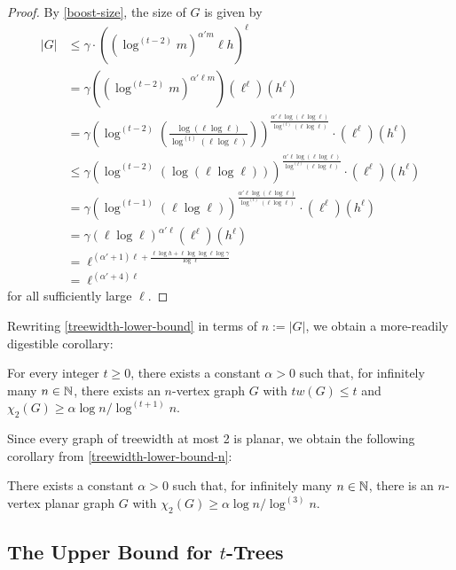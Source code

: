 \documentclass[kpfonts]{patmorin}
\newcommand{\uqs}{\chi_2}
\begin{document}
\begin{proof}
   By \cref{boost-size}, the size of $G$ is given by
   \begin{align*}
        |G| & \le \gamma\cdot \left((\log^{(t-2)}m)^{\alpha' m}\ell h\right)^\ell \\
        & = \gamma ((\log^{(t-2)}m)^{\alpha'\ell m}) (\ell^\ell) (h^\ell) \\
        & = \gamma \left(\log^{(t-2)}\left(\frac{\log(\ell\log\ell)}{\log^{(t)}(\ell\log\ell)}\right)\right)
        ^{\frac{\alpha'\ell\log(\ell\log\ell)}{\log^{(t)}(\ell\log\ell)}} \cdot (\ell^\ell) (h^\ell) \\
        & \le \gamma \left(\log^{(t-2)}(\log(\ell\log\ell))\right)
        ^{\frac{\alpha'\ell\log(\ell\log\ell)}{\log^{(t)}(\ell\log\ell)}} \cdot (\ell^\ell) (h^\ell) \\
        & = \gamma \left(\log^{(t-1)}(\ell\log\ell)\right)
        ^{\frac{\alpha'\ell\log(\ell\log\ell)}{\log^{(t)}(\ell\log\ell)}} \cdot (\ell^\ell) (h^\ell) \\
        & = \gamma (\ell\log\ell)^{\alpha'\ell} (\ell^\ell) (h^\ell) \\
        & = \ell^{(\alpha'+1)\ell + \frac{\ell\log h + \ell\log\log\ell \log\gamma}{\log\ell}} \\
        & = \ell^{(\alpha'+4)\ell}
   \end{align*}
   for all sufficiently large $\ell$.
\end{proof}

Rewriting \cref{treewidth-lower-bound} in terms of $n:=|G|$, we obtain a more-readily digestible corollary:

\begin{cor}\label{treewidth-lower-bound-n}
    For every integer $t\ge 0$, there exists a constant $\alpha>0$ such that, for infinitely many $n\in\mathbb{N}$,   there exists an $n$-vertex graph $G$ with $tw(G)\le t$ and  $\uqs(G)\ge \alpha\log n/\log^{(t+1)} n$.
\end{cor}

Since every graph of treewidth at most 2 is planar, we obtain the following corollary from \cref{treewidth-lower-bound-n}:

\begin{cor}\label{planar-lower-bound}
    There exists a constant $\alpha>0$ such that, for infinitely many $n\in\mathbb{N}$, there is an $n$-vertex planar graph $G$ with $\uqs(G)\ge \alpha\log n/\log^{(3)} n$.
\end{cor}

\subsection{The Upper Bound for $t$-Trees}
\end{document}
